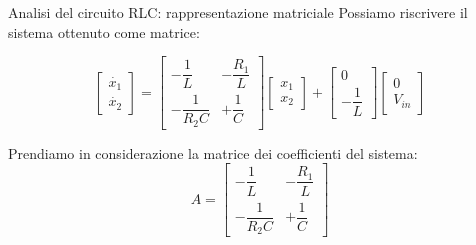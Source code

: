 \documentclass[aspectratio=169, 10pt, handout,usenames,dvipsnames]{beamer}
\begin{document}
\begin{frame}{Analisi del circuito RLC: rappresentazione matriciale}
Possiamo riscrivere il sistema ottenuto come matrice:

\large
\begin{center}
\[
    \begin{bmatrix} 
    \dot{x_1} \\ 
    \dot{x_2} \end{bmatrix}  = 
    \begin{bmatrix}
    -\dfrac{1}{L} & - \dfrac{R_1}{L}\\[1.5ex]
    -\dfrac{1}{R_2C} & + \dfrac{1}{C}
    \end{bmatrix} 
    \begin{bmatrix} 
    x_1 \\ 
    x_2 \end{bmatrix}
    +
    \begin{bmatrix} 
    0 \\[1.5ex]
    -\dfrac{1}{L} 
    \end{bmatrix}
    \begin{bmatrix} 
    0 \\ 
    V_{in} 
    \end{bmatrix}
\]
\end{center}
\normalsize
Prendiamo in considerazione la matrice dei coefficienti del sistema:
\large\medskip
\[ A = \begin{bmatrix}
-\dfrac{1}{L} & - \dfrac{R_1}{L}\\[1.5ex]
-\dfrac{1}{R_2C} & + \dfrac{1}{C}
\end{bmatrix} \]

\end{frame}
\end{document}

